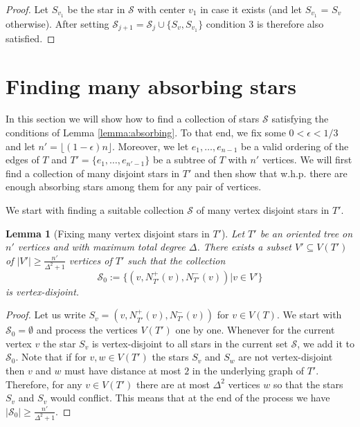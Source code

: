 \documentclass[10pt, a4paper]{article}
\newtheorem{lemma}[theorem]{Lemma}
\theoremstyle{remark}
\begin{document}
\begin{proof}
    Let $S_{v_1}$ be the star in $\mathcal{S}$ with center $v_1$ in case it exists (and let $S_{v_1}$ = $S_v$ otherwise).
    After setting $\mathcal{S}_{j+1} = \mathcal{S}_j \cup \{ S_v, S_{v_1}\}$ condition 3 is therefore also satisfied.
\end{proof}

\section{Finding many absorbing stars}\label{section:manystars}
In this section we will show how to find a collection of stars $\mathcal{S}$ satisfying the conditions of Lemma \ref{lemma:absorbing}.
To that end, we fix some $0 < \epsilon < 1/3$ and let $n' = \lfloor (1- \epsilon)n \rfloor$.
Moreover, we let $e_1, \dots, e_{n-1}$ be a valid ordering of the edges of $T$ and $T' = \{ e_1, \dots, e_{n'-1} \}$ be a subtree of $T$ with $n'$ vertices.
We will first find a collection of many disjoint stars in $T'$ and then show that w.h.p. there are enough absorbing stars among them for any pair of vertices.

We start with finding a suitable collection $\mathcal{S}$ of many vertex disjoint stars in $T'$.

\begin{lemma}[Fixing many vertex disjoint stars in $T'$]\label{lemma:findingstars}
    Let $T'$ be an oriented tree on $n'$ vertices and with maximum total degree $\Delta$.
    There exists a subset $V' \subseteq V(T')$ of $|V'| \geq \frac{n'}{\Delta^2+1}$ vertices of $T'$ such that the collection 
    \[\mathcal{S}_0 := \{ (v, N^+_{T'}(v), N^-_{T'}(v)) | v\in V' \}\]
    is vertex-disjoint.
\end{lemma}
\begin{proof}
    Let us write $S_v = (v, N^+_{T'}(v), N^-_{T'}(v))$ for $v \in V(T)$.
    We start with $\mathcal{S}_0 = \emptyset$ and process the vertices $V(T')$ one by one.
    Whenever for the current vertex $v$ the star $S_v$ is vertex-disjoint to all stars in the current set $\mathcal{S}$,
    we add it to $\mathcal{S}_0$.
    Note that if for $v, w \in V(T')$ the stars $S_v$ and $S_w$ are not vertex-disjoint then $v$ and $w$ must have distance at most $2$ in the underlying graph of $T'$.
    Therefore, for any $v \in V(T')$ there are at most $\Delta^2$ vertices $w$ so that the stars $S_v$ and $S_v$ would conflict.
    This means that at the end of the process we have $|\mathcal{S}_0| \geq \frac{n'}{\Delta^2+1}$.
\end{proof}
\end{document}
